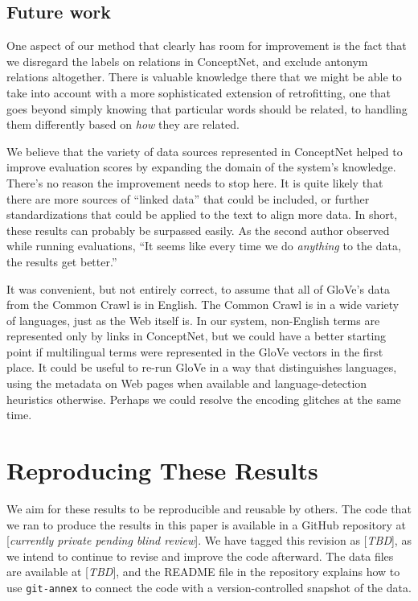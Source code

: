 \documentclass[letterpaper]{article}
\begin{document}
\subsection{Future work}

One aspect of our method that clearly has room for improvement is the fact that
we disregard the labels on relations in ConceptNet, and exclude antonym
relations altogether. There is valuable knowledge there that we might be able
to take into account with a more sophisticated extension of retrofitting, one
that goes beyond simply knowing that particular words should be related, to
handling them differently based on {\em how} they are related.

We believe that the variety of data sources represented in ConceptNet helped
to improve evaluation scores by expanding the domain of the system's knowledge.
There's no reason the improvement needs to stop here. It is quite likely that
there are more sources of ``linked data'' that could be included, or further
standardizations that could be applied to the text to align more data. In short,
these results can probably be surpassed easily. As the
second author observed while running evaluations, ``It seems like every time we
do {\em anything} to the data, the results get better.''

It was convenient, but not entirely correct, to assume that all of GloVe's data
from the Common Crawl is in English. The Common Crawl is in a wide variety of
languages, just as the Web itself is. In our system, non-English terms are
represented only by links in ConceptNet, but we could have a better starting
point if multilingual terms were represented in the GloVe vectors in the first
place. It could be useful to re-run GloVe in a way that distinguishes languages,
using the metadata on Web pages when available and language-detection heuristics
otherwise. Perhaps we could resolve the encoding glitches at the same time.

\section{Reproducing These Results}

We aim for these results to be reproducible and reusable by others. The code
that we ran to produce the results in this paper is available in a GitHub
repository at [{\em currently private pending blind review}]. We have tagged
this revision as [{\em TBD}], as we intend to continue to revise and improve the
code afterward. The data files are available at [{\em TBD}], and the README file
in the repository explains how to use {\tt git-annex} to connect the code
with a version-controlled snapshot of the data.

\begin{CJK*}{UTF8}{min}

\end{CJK*}
\end{document}
